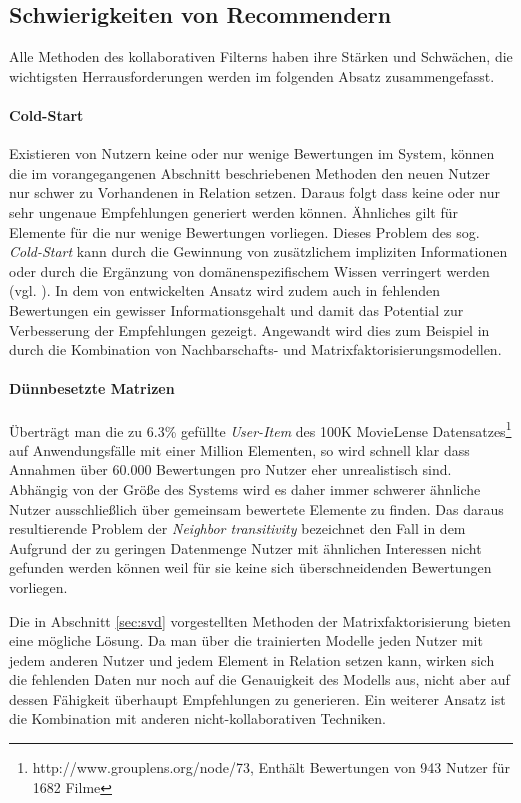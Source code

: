 \subsection{Schwierigkeiten von Recommendern}\label{sec:filterissues}

Alle Methoden des kollaborativen Filterns haben ihre Stärken und Schwächen, die wichtigsten Herrausforderungen werden im folgenden Absatz zusammengefasst.

\paragraph{Cold-Start} Existieren von Nutzern keine oder nur wenige Bewertungen im System, können die im vorangegangenen Abschnitt beschriebenen Methoden den neuen Nutzer nur schwer zu Vorhandenen in Relation setzen. Daraus folgt dass keine oder nur sehr ungenaue Empfehlungen generiert werden können. Ähnliches gilt für Elemente für die nur wenige Bewertungen vorliegen. Dieses Problem des sog. \textit{Cold-Start} kann durch die Gewinnung von zusätzlichem impliziten Informationen oder durch die Ergänzung von domänenspezifischem Wissen verringert werden (vgl. \citep{claypool99}).  In dem von \citep{Steck:2010:TTR:1835804.1835895} entwickelten Ansatz wird zudem auch in fehlenden Bewertungen ein gewisser Informationsgehalt und damit das Potential zur Verbesserung der Empfehlungen gezeigt. Angewandt wird dies zum Beispiel in \citep{Toscher:2008:INA:1722149.1722153} durch die Kombination von Nachbarschafts- und Matrixfaktorisierungsmodellen.

\paragraph{Dünnbesetzte Matrizen} Überträgt man die zu 6.3\% gefüllte \textit{User-Item} des 100K MovieLense Datensatzes\footnote{http://www.grouplens.org/node/73, Enthält Bewertungen von 943 Nutzer für 1682 Filme} auf Anwendungsfälle mit einer Million Elementen, so wird schnell klar dass Annahmen über 60.000 Bewertungen pro Nutzer eher unrealistisch sind. Abhängig von der Größe des Systems wird es daher immer schwerer ähnliche Nutzer ausschließlich über gemeinsam bewertete Elemente zu finden. Das daraus resultierende Problem der \textit{Neighbor transitivity} bezeichnet den Fall in dem Aufgrund der zu geringen Datenmenge Nutzer mit ähnlichen Interessen nicht gefunden werden können weil für sie keine sich überschneidenden Bewertungen vorliegen.

Die in Abschnitt \ref{sec:svd} vorgestellten Methoden der Matrixfaktorisierung bieten eine mögliche Lösung. Da man über die trainierten Modelle jeden Nutzer mit jedem anderen Nutzer und jedem Element in Relation setzen kann, wirken sich die fehlenden Daten nur noch auf die Genauigkeit des Modells aus, nicht aber auf dessen Fähigkeit überhaupt Empfehlungen zu generieren. Ein weiterer Ansatz ist die Kombination mit anderen nicht-kollaborativen Techniken. \citep{Koren:2009:MFT:1608565.1608614,claypool99}

